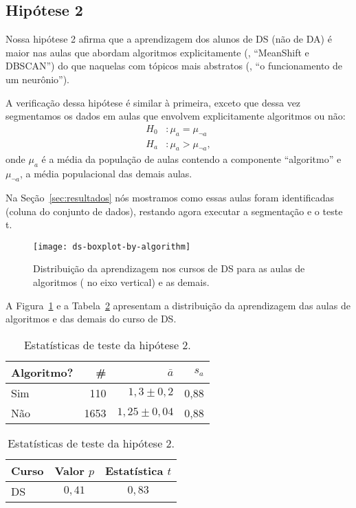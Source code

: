 \subsection{Hipótese 2}
\label{sec:resultados-hipotese-2}

Nossa hipótese 2 afirma que a aprendizagem dos alunos de DS (não de DA) é maior nas aulas que abordam algoritmos explicitamente (\eg, ``MeanShift e DBSCAN'') do que naquelas com tópicos mais abstratos (\eg, ``o funcionamento de um neurônio'').

A verificação dessa hipótese é similar à primeira, exceto que dessa vez segmentamos os dados em aulas que envolvem explicitamente algoritmos ou não:
\begin{align*}
	H_0&: \mu_a = \mu_{\neg a} \\
	H_a&: \mu_a > \mu_{\neg a},
\end{align*}
onde $\mu_a$ é a média da população de aulas contendo a componente ``algoritmo'' e $\mu_{\neg a}$, a média populacional das demais aulas.

Na Seção~\ref{sec:resultados} nós mostramos como essas aulas foram identificadas (coluna  do conjunto de dados), restando agora executar a segmentação e o teste t.

\begin{figure}
	\centering
	\texttt{[image: ds-boxplot-by-algorithm]}
	\caption{Distribuição da aprendizagem nos cursos de DS para as aulas de algoritmos ( no eixo vertical) e as demais.}
	\label{fig:dist-hipotese-2}
\end{figure}

A Figura~\ref{fig:dist-hipotese-2} e a Tabela~\ref{tab:dist-hipotese-2} apresentam a distribuição da aprendizagem das aulas de algoritmos e das demais do curso de DS.

\begin{table}
	\centering
	\begin{minipage}[t]{0.46\textwidth}
		\caption{Tamanho da amostra (\#), média e desvio-padrão da aprendizagem em DS.}
		\label{tab:dist-hipotese-2}
		\begin{tabular}{lrrr}
			\toprule
			Algoritmo? & \# & $\bar{a}$ & $s_a$ \\
			\midrule
			Sim &  110 &  $1,3\pm 0,2$ & 0,88 \\
			Não & 1653 & $1,25\pm 0,04$ & 0,88 \\
			\bottomrule
		\end{tabular}
	\end{minipage}\hfill
	\begin{minipage}[t]{0.46\textwidth}
		\caption{Estatísticas de teste da hipótese 2.}
		\begin{tabular}{lcc}
		\toprule
		Curso & Valor $p$   & Estatística $t$ \\
		\midrule
		DS    & $0,41$      & $0,83$ \\ 
		\bottomrule
		\end{tabular}
	\end{minipage}
\end{table}

